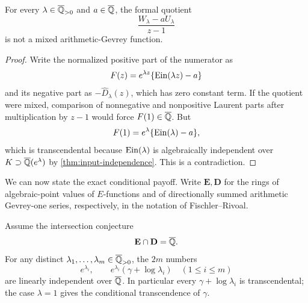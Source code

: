 \begin{proposition}
\label{prop:mixed-nondivisibility}
For every \(\lambda\in\overline{\mathbb Q}_{>0}\) and \(a\in\overline{\mathbb Q}\), the formal quotient
\begin{equation}\label{eq:mixed-quotient}
 \frac{W_\lambda-aU_\lambda}{z-1}
\end{equation}
is not a mixed arithmetic-Gevrey function.
\end{proposition}

\begin{proof}
Write the normalized positive part of the numerator as
\[
 F(z)=e^{\lambda z}\{\operatorname{Ein}(\lambda z)-a\}
\]
and its negative part as \(-\widehat D_\lambda(z)\), which has zero constant
term.  If the quotient were mixed, comparison of nonnegative and
nonpositive Laurent parts after multiplication by \(z-1\) would force
\(F(1)\in\overline{\mathbb Q}\).  But
\[
 F(1)=e^\lambda\{\operatorname{Ein}(\lambda)-a\},
\]
which is transcendental because \(\operatorname{Ein}(\lambda)\) is algebraically
independent over \(K\supset\overline{\mathbb Q}(e^\lambda)\) by
\cref{thm:input-independence}.  This is a contradiction.
\end{proof}

We can now state the exact conditional payoff.  Write
\(\mathbf E,\mathbf D\) for the rings of algebraic-point values of
\(E\)-functions and of directionally summed arithmetic Gevrey-one series,
respectively, in the notation of Fischler--Rivoal.

\begin{theorem}
\label{thm:conditional-mixed-dilations}
Assume the intersection conjecture
\begin{equation}\label{eq:ED-intersection}
 \mathbf E\cap\mathbf D=\overline{\mathbb Q}.
\end{equation}
For any distinct
\(\lambda_1,\ldots,\lambda_m\in\overline{\mathbb Q}_{>0}\), the \(2m\) numbers
\begin{equation}\label{eq:mixed-dilation-values}
 \boxed{\displaystyle
 e^{\lambda_i},\qquad
 e^{\lambda_i}(\gamma+\log\lambda_i)
 \quad(1\le i\le m)}
\end{equation}
are linearly independent over \(\overline{\mathbb Q}\).  In particular every
\(\gamma+\log\lambda_i\) is transcendental; the case \(\lambda=1\) gives
the conditional transcendence of \(\gamma\).
\end{theorem}

